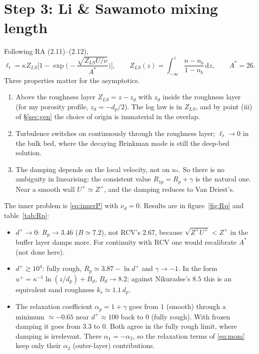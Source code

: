 \documentclass[10pt,a4paper]{article}
\newcommand{\dd}{\mathrm{d}}
\newcommand{\Rp}{R_p}
\newcommand{\Rop}{R_{1p}}
\begin{document}
\section{Step 3: Li \& Sawamoto mixing length}\label{sec:LS}
Following RA (2.11)--(2.12),
\begin{equation}
\ell_t=\kappa Z_{LS}\Big[1-\exp\Big(-\frac{\sqrt{Z_{LS}U/\nu}}{A^*}\Big)\Big],\qquad Z_{LS}(z)=\int_{-\infty}^z\frac{n-n_b}{1-n_b}\,\dd z,\qquad A^*=26 .
\end{equation}
Three properties matter for the asymptotics.
\begin{enumerate}[nosep]
\item Above the roughness layer $Z_{LS}=z-z_d$ with $z_d$ inside the roughness layer (for my porosity profile, $z_d=-d_p/2$). The log law is in $Z_{LS}$, and by point (iii) of §\ref{sec:gen} the choice of origin is immaterial in the overlap.
\item Turbulence switches on continuously through the roughness layer; $\ell_t\to0$ in the bulk bed, where the decaying Brinkman mode is still the deep-bed solution.
\item The damping depends on the local velocity, not on $u_*$. So there is no ambiguity in linearising: the consistent value $\Rop=\Rp+\gamma$ is the natural one. Near a smooth wall $U^+\simeq Z^+$, and the damping reduces to Van Driest's.
\end{enumerate}
The inner problem is \eqref{eq:innerP} with $\nu_d=0$. Results are in figure~\ref{fig:Rp} and table~\ref{tab:Rp}:
\begin{itemize}[nosep]
\item $d^+\to0$: $\Rp\to3.46$ ($B\simeq7.2$), not RCV's $2.67$, because $\sqrt{Z^+U^+}<Z^+$ in the buffer layer damps more. For continuity with RCV one would recalibrate $A^*$ (not done here).
\item $d^+\gtrsim10^4$: fully rough, $\Rp\simeq3.87-\ln d^+$ and $\gamma\to-1$. In the form $u^+=\kappa^{-1}\ln(z/d_p)+B_d$, $B_d\to8.2$; against Nikuradse's $8.5$ this is an equivalent sand roughness $k_s\simeq1.1\,d_p$.
\item The relaxation coefficient $\alpha_p=1+\gamma$ goes from $1$ (smooth) through a minimum $\simeq-0.65$ near $d^+\approx100$ back to $0$ (fully rough). With frozen damping it goes from $3.3$ to $0$. Both agree in the fully rough limit, where damping is irrelevant. There $\alpha_1=-\alpha_2$, so the relaxation terms of \eqref{eq:mom} keep only their $\alpha_2$ (outer-layer) contributions.
\end{itemize}
\end{document}

